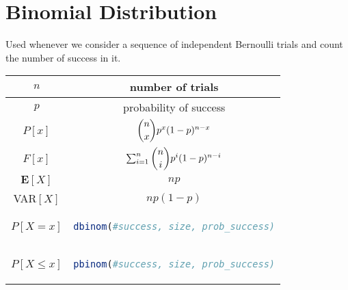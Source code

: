 \section{Binomial Distribution}
\begin{tcolorbox}
Used whenever we consider a sequence of independent Bernoulli trials and count the number of success in it.
\end{tcolorbox}
\begingroup
\setlength{\tabcolsep}{10pt} %
\renewcommand{\arraystretch}{1.5} %
\begin{center}
\begin{tabular}{ |c|c| } 
\hline
\(n\) & number of trials \\ \hline
\(p\) & probability of success \\ \hline
\(P[x]\) & $\dbinom{n}{x} p^x(1-p)^{n - x}$\\ \hline
\(F[x]\) & $\sum_{i = 1}^n \dbinom{n}{i} p^i(1 - p)^{n-i}$ \\ \hline
\(\mathbf{E}[X]\) & \(np\) \\ \hline
VAR\([X]\) & \(np(1 - p)\) \\ \hline\hline
\(P[X = x]\) & \begin{lstlisting}[language=R]
dbinom(#success, size, prob_success)
\end{lstlisting} \\ \hline
\(P[X \leq x]\) & \begin{lstlisting}[language=R]
pbinom(#success, size, prob_success)
\end{lstlisting} \\ \hline
\end{tabular}
\end{center}
\endgroup





